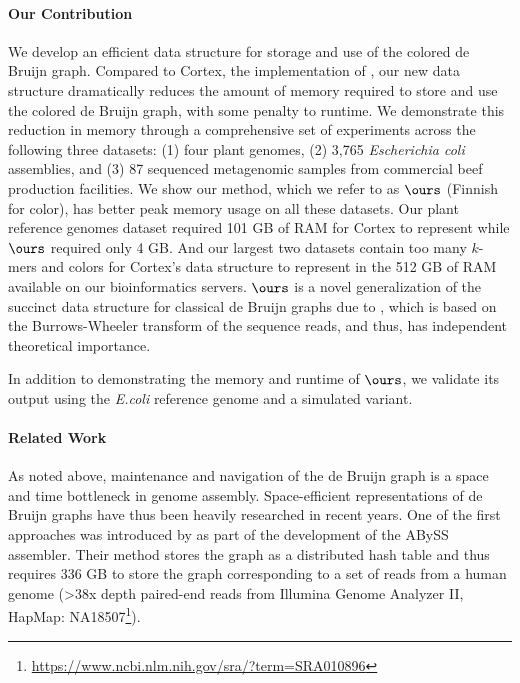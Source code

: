 \documentclass[doctor]{thesis}
\begin{document}
\paragraph{Our Contribution}  
We develop an efficient data structure for storage and use of the colored de Bruijn graph. Compared to {\sc Cortex}, the implementation of \cite{ICTFM12}, our new data structure dramatically reduces the amount of memory required to store and use the colored de Bruijn graph, with some penalty to runtime. We demonstrate this reduction in memory through a comprehensive set of experiments across the following three datasets: (1)  four plant genomes, (2) 3,765 {\em Escherichia coli} assemblies,
 and (3) 87 sequenced metagenomic samples from commercial beef production facilities.  We show our method, which we refer to as $\ours$ (Finnish for color), has better peak memory usage on all these datasets. Our plant reference genomes dataset required 101 GB of RAM for  {\sc Cortex} to represent while $\ours$ required only 4 GB.  And  our
largest two datasets contain too many $k$-mers and colors for {\sc Cortex}'s data structure to represent in the 512 GB of RAM available on our bioinformatics servers. $\ours$ is a novel generalization of the succinct data structure for classical de Bruijn graphs due to \cite{BOSS12}, which is based on the Burrows-Wheeler transform of the sequence reads, and thus, has independent theoretical importance.

In addition to demonstrating the memory and runtime of $\ours$, we validate its output using the {\em E.coli} reference genome and a simulated variant.


\paragraph{Related Work} As noted above, maintenance and navigation of the de Bruijn graph is a space and time bottleneck in genome assembly. Space-efficient representations of de Bruijn graphs have thus been heavily researched in recent years. One of the first approaches was introduced by \cite{Simpson:2009} as part of the development of the ABySS assembler.  Their method stores the graph as a distributed hash table and thus requires 336 GB to store the graph corresponding to a set of reads from a human genome (>38x depth paired-end reads from Illumina Genome Analyzer II, HapMap: NA18507\footnote{\url{https://www.ncbi.nlm.nih.gov/sra/?term=SRA010896}}). 
 
\end{document}
